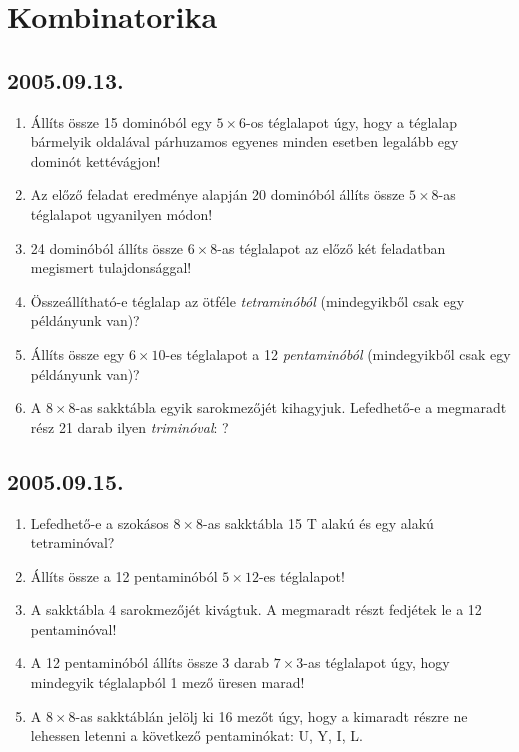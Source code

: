 \documentclass{article}
\begin{document}
\section*{Kombinatorika}

\subsection*{2005.09.13.}
\begin{enumerate}
\item Állíts össze 15 dominóból egy $5\times 6$-os
téglalapot úgy, hogy a téglalap bármelyik oldalával
párhuzamos egyenes minden esetben legalább egy dominót kettévágjon!
\item Az előző feladat eredménye alapján 20 dominóból állíts össze $5\times 8$-as téglalapot ugyanilyen módon!
\item 24 dominóból állíts össze $6\times 8$-as téglalapot az előző két feladatban megismert tulajdonsággal!
\item Összeállítható-e téglalap az ötféle \textit{tetraminóból} (mindegyikből csak egy példányunk van)?
\item Állíts össze egy $6\times 10$-es téglalapot
a 12 \textit{pentaminóból} (mindegyikből csak egy példányunk van)?
\item A $8\times 8$-as sakktábla egyik sarokmezőjét kihagyjuk. Lefedhető-e a megmaradt rész 21 darab ilyen \textit{tri\-minóval}: 
?
\end{enumerate}

\subsection*{2005.09.15.}
\begin{enumerate}
\item Lefedhető-e a szokásos $8\times 8$-as sakktábla 15 T alakú és egy
alakú tetraminóval?
\item Állíts össze a 12 pentaminóból $5\times 12$-es
téglalapot!
\item A sakktábla 4 sarokmezőjét kivágtuk.
A megmaradt részt fedjétek le a 12 pentaminóval!
\item A 12 pentaminóból állíts össze 3 darab $7\times 3$-as téglalapot úgy, hogy mindegyik téglalapból 1 mező üresen marad! 
\item A $8\times 8$-as sakktáblán jelölj ki 16 mezőt úgy, hogy a kimaradt részre ne lehessen letenni a következő pentaminókat: U, Y, I, L.
\end{enumerate}
\end{document}
